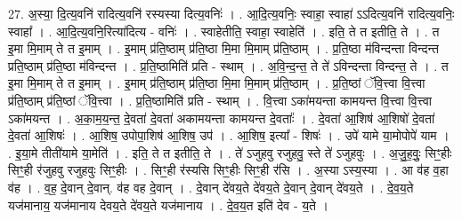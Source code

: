 \documentclass[17pt]{extarticle}
\begin{document}
27. अ॒स्या॒ दि॒त्य॒वनि॑ रादित्य॒वनि॑ रस्यस्या दित्य॒वनिः॑ । . आ॒दि॒त्य॒वनिः॒ स्वाहा॒ स्वाहा॑ ऽऽदित्य॒वनि॑ रादित्य॒वनिः॒ स्वाहा᳚ । . आ॒दि॒त्य॒वनि॒रित्या॑दित्य - वनिः॑ । . स्वाहेतीति॒ स्वाहा॒ स्वाहेति॑ । . इति॒ ते त इतीति॒ ते । . त इ॒मा मि॒माम् ते त इ॒माम् । . इ॒माम् प्र॑ति॒ष्ठाम् प्र॑ति॒ष्ठा मि॒मा मि॒माम् प्र॑ति॒ष्ठाम् । . प्र॒ति॒ष्ठा म॑विन्दन्ता विन्दन्त प्रति॒ष्ठाम् प्र॑ति॒ष्ठा म॑विन्दन्त । . प्र॒ति॒ष्ठामिति॑ प्रति - स्थाम् । . अ॒वि॒न्द॒न्त॒ ते ते॑ ऽविन्दन्ता विन्दन्त॒ ते । . त इ॒मा मि॒माम् ते त इ॒माम् । . इ॒माम् प्र॑ति॒ष्ठाम् प्र॑ति॒ष्ठा मि॒मा मि॒माम् प्र॑ति॒ष्ठाम् । . प्र॒ति॒ष्ठां ॅवि॒त्त्वा वि॒त्त्वा प्र॑ति॒ष्ठाम् प्र॑ति॒ष्ठां ॅवि॒त्त्वा । . प्र॒ति॒ष्ठामिति॑ प्रति - स्थाम् । . वि॒त्त्वा ऽका॑मयन्ता कामयन्त वि॒त्त्वा वि॒त्त्वा ऽका॑मयन्त । . अ॒का॒म॒य॒न्त॒ दे॒वता॑ दे॒वता॑ अकामयन्ता कामयन्त दे॒वताः᳚ । . दे॒वता॑ आ॒शिष॑ आ॒शिषो॑ दे॒वता॑ दे॒वता॑ आ॒शिषः॑ । . आ॒शिष॒ उपोपा॒शिष॑ आ॒शिष॒ उप॑ । . आ॒शिष॒ इत्या᳚ - शिषः॑ । . उपे॑ यामे या॒मोपोपे॑ याम । . इ॒या॒मे तीती॑यामे या॒मेति॑ । . इति॒ ते त इतीति॒ ते । . ते॑ ऽजुहवु रजुहवु॒ स्ते ते॑ ऽजुहवुः । . अ॒जु॒ह॒वुः॒ सिꣳ॒॒हीः सिꣳ॒॒ही र॑जुहवु रजुहवुः सिꣳ॒॒हीः । . सिꣳ॒॒ही र॑स्यसि सिꣳ॒॒हीः सिꣳ॒॒ही र॑सि । . अ॒स्या ऽस्य॒स्या । . आ व॑ह व॒हा व॑ह । . व॒ह॒ दे॒वान् दे॒वान्. व॑ह वह दे॒वान् । . दे॒वान् दे॑वय॒ते दे॑वय॒ते दे॒वान् दे॒वान् दे॑वय॒ते । . दे॒व॒य॒ते यज॑मानाय॒ यज॑मानाय देवय॒ते दे॑वय॒ते यज॑मानाय । . दे॒व॒य॒त इति॑ देव - य॒ते । \newline
\end{document}
